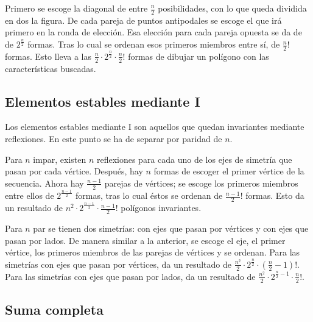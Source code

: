 		Primero se escoge la diagonal de entre $\frac{n}{2}$ posibilidades, con lo que queda dividida en dos la figura. De cada pareja de puntos antipodales se escoge el que irá primero en la ronda de elección. Esa elección para cada pareja opuesta se da de de $2^{\frac{n}{2}}$ formas. Tras lo cual se ordenan esos primeros miembros entre sí, de $\frac{n}{2}!$ formas. Esto lleva a las $\frac{n}{2}\cdot2^{\frac{n}{2}}\cdot\frac{n}{2}!$ formas de dibujar un polígono con las características buscadas.		%
		
		\subsection{Elementos estables mediante I}
		
		Los elementos estables mediante I son aquellos que quedan invariantes mediante reflexiones. En este punto se ha de separar por paridad de $n$. 
		
		Para $n$ impar, existen $n$ reflexiones para cada uno de los ejes de simetría que pasan por cada vértice. Después, hay $n$ formas de escoger el primer vértice de la secuencia. Ahora hay $\frac{n-1}{2}$ parejas de vértices; se escoge los primeros miembros entre ellos de $2^{\frac{n-1}{2}}$ formas, tras lo cual éstos se ordenan de $\frac{n-1}{2}!$ formas. Esto da un resultado de  $n^2\cdot2^{\frac{n-1}{2}}\cdot\frac{n-1}{2}!$ polígonos invariantes.
		
		Para $n$ par se tienen dos simetrías: con ejes que pasan por vértices y con ejes que pasan por lados. De manera similar a la anterior, se escoge el eje, el primer vértice, los primeros miembros de las parejas de vértices y se ordenan. Para las simetrías con ejes que pasan por vértices, da un resultado de  $\frac{n^2}{2}\cdot2^{\frac{n}{2}}\cdot\left(\frac{n}{2}-1\right)!$. Para las simetrías con ejes que pasan por lados, da un resultado de $\frac{n^2}{2}\cdot2^{\frac{n}{2}-1}\cdot\frac{n}{2}!$.
		
		\subsection*{Suma completa}
		
